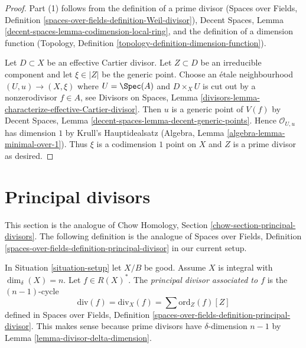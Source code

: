 \begin{proof}
Part (1) follows from the definition of a prime divisor
(Spaces over Fields, Definition
\ref{spaces-over-fields-definition-Weil-divisor}),
Decent Spaces, Lemma \ref{decent-spaces-lemma-codimension-local-ring},
and the definition of a dimension function
(Topology, Definition \ref{topology-definition-dimension-function}).

\medskip\noindent
Let $D \subset X$ be an effective Cartier divisor. Let $Z \subset D$
be an irreducible component and let $\xi \in |Z|$ be the generic point.
Choose an \'etale neighbourhood $(U, u) \to (X, \xi)$ where $U = \Spec(A)$
and $D \times_X U$ is cut out by a nonzerodivisor $f \in A$, see
Divisors on Spaces, Lemma
\ref{divisors-lemma-characterize-effective-Cartier-divisor}.
Then $u$ is a generic point of $V(f)$ by
Decent Spaces, Lemma \ref{decent-spaces-lemma-decent-generic-points}.
Hence $\mathcal{O}_{U, u}$ has dimension $1$ by
Krull's Hauptidealsatz (Algebra, Lemma \ref{algebra-lemma-minimal-over-1}).
Thus $\xi$ is a codimension $1$ point on $X$ and $Z$ is a prime
divisor as desired.
\end{proof}












\section{Principal divisors}
\label{section-principal-divisors}

\noindent
This section is the analogue of
Chow Homology, Section \ref{chow-section-principal-divisors}.
The following definition is the analogue of
Spaces over Fields, Definition
\ref{spaces-over-fields-definition-principal-divisor}
in our current setup.

\begin{definition}
\label{definition-principal-divisor}
In Situation \ref{situation-setup} let $X/B$ be good. Assume $X$ is
integral with $\dim_\delta(X) = n$.
Let $f \in R(X)^*$. The {\it principal divisor associated to $f$}
is the $(n - 1)$-cycle
$$
\text{div}(f) = \text{div}_X(f) = \sum \text{ord}_Z(f) [Z]
$$
defined in Spaces over Fields, Definition
\ref{spaces-over-fields-definition-principal-divisor}.
This makes sense because prime divisors have $\delta$-dimension $n - 1$ by
Lemma \ref{lemma-divisor-delta-dimension}.
\end{definition}

